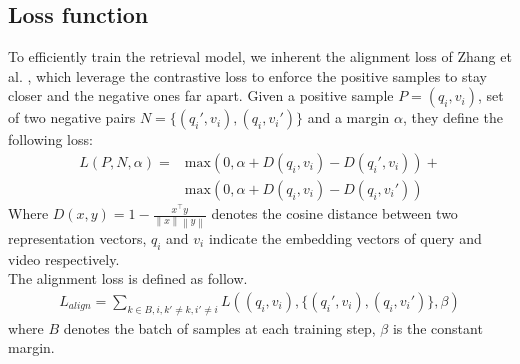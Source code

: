 \subsection{Loss function}
To efficiently train the retrieval model, we inherent the alignment loss of Zhang et al. \cite{zhang2018cross}, which leverage the contrastive loss to enforce the positive samples to stay closer and the negative ones far apart. 
Given a positive sample $P = (q_i, v_i)$, set of two negative pairs $N = \{({q_i}', v_i), (q_i, {v_i}')\}$ and a margin $\alpha$, they define the following loss:
\begin{equation}
\begin{split}
    L(P, N, \alpha) = & \mathrm{max}(0, \alpha + D(q_i, v_i) - D({q_i}', v_i)) + \\ 
    & \mathrm{max}(0, \alpha + D(q_i, v_i) - D(q_i, {v_i}'))
\end{split}
\end{equation}
Where $D(x, y) = 1 - \frac{x^{\top}y}{\left \| x \right \|\left \| y \right \|}$ denotes the cosine distance between two representation vectors, $q_i$ and $v_i$ indicate the embedding vectors of query and video respectively. \\
The alignment loss is defined as follow.
\begin{align}
    L_{align} = \sum_{k \in B, i, {k}'\neq k, {i}'\neq i} L((q_i, v_i), \{({q_i}', v_i),(q_i, {v_i}')\}, \beta)
\end{align}
where $B$ denotes the batch of samples at each training step, $\beta$ is the constant margin.